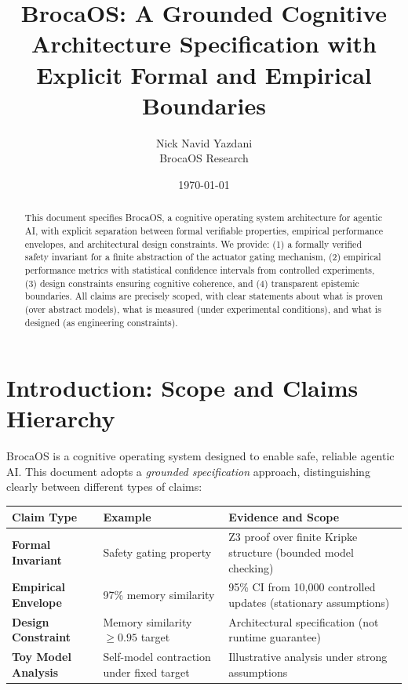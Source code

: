 \documentclass[12pt]{article}
\title{BrocaOS: A Grounded Cognitive Architecture Specification with Explicit Formal and Empirical Boundaries}
\author{Nick Navid Yazdani\\BrocaOS Research}
\date{\today}
\theoremstyle{definition}
\begin{document}
\maketitle

\begin{abstract}
This document specifies BrocaOS, a cognitive operating system architecture for agentic AI, with explicit separation between formal verifiable properties, empirical performance envelopes, and architectural design constraints. We provide: (1) a formally verified safety invariant for a finite abstraction of the actuator gating mechanism, (2) empirical performance metrics with statistical confidence intervals from controlled experiments, (3) design constraints ensuring cognitive coherence, and (4) transparent epistemic boundaries. All claims are precisely scoped, with clear statements about what is proven (over abstract models), what is measured (under experimental conditions), and what is designed (as engineering constraints).
\end{abstract}

\section{Introduction: Scope and Claims Hierarchy}

BrocaOS is a cognitive operating system designed to enable safe, reliable agentic AI. This document adopts a \emph{grounded specification} approach, distinguishing clearly between different types of claims:

\begin{center}
\begin{tabular}{@{}p{}p{}p{}@{}}
\toprule
\textbf{Claim Type} & \textbf{Example} & \textbf{Evidence and Scope} \\
\midrule
\textbf{Formal Invariant} & Safety gating property & Z3 proof over finite Kripke structure (bounded model checking) \\
\textbf{Empirical Envelope} & 97\% memory similarity & 95\% CI from 10,000 controlled updates (stationary assumptions) \\
\textbf{Design Constraint} & Memory similarity $\geq 0.95$ target & Architectural specification (not runtime guarantee) \\
\textbf{Toy Model Analysis} & Self-model contraction under fixed target & Illustrative analysis under strong assumptions \\
\bottomrule
\end{tabular}
\end{center}
\end{document}
